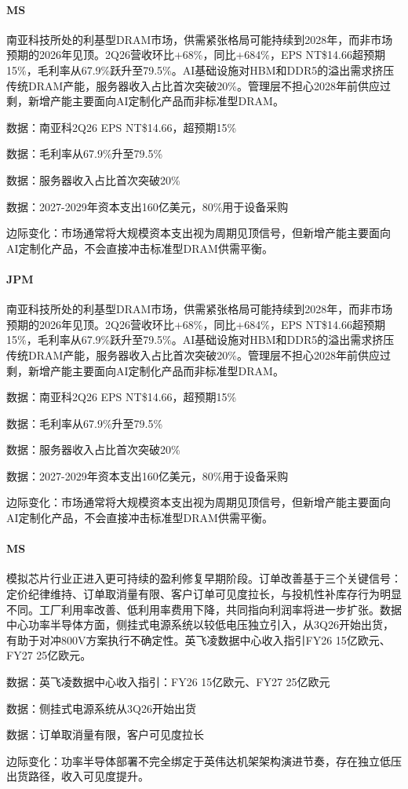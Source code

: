\documentclass[11pt]{ctexart}
\begin{document}
\paragraph{MS} 南亚科技所处的利基型DRAM市场，供需紧张格局可能持续到2028年，而非市场预期的2026年见顶。2Q26营收环比+68\%，同比+684\%，EPS NT\$14.66超预期15\%，毛利率从67.9\%跃升至79.5\%。AI基础设施对HBM和DDR5的溢出需求挤压传统DRAM产能，服务器收入占比首次突破20\%。管理层不担心2028年前供应过剩，新增产能主要面向AI定制化产品而非标准型DRAM。
{\small\color{refgray}数据：南亚科2Q26 EPS NT\$14.66，超预期15\%\par}
{\small\color{refgray}数据：毛利率从67.9\%升至79.5\%\par}
{\small\color{refgray}数据：服务器收入占比首次突破20\%\par}
{\small\color{refgray}数据：2027-2029年资本支出160亿美元，80\%用于设备采购\par}
{\small\color{refgray}边际变化：市场通常将大规模资本支出视为周期见顶信号，但新增产能主要面向AI定制化产品，不会直接冲击标准型DRAM供需平衡。\par}
\paragraph{JPM} 南亚科技所处的利基型DRAM市场，供需紧张格局可能持续到2028年，而非市场预期的2026年见顶。2Q26营收环比+68\%，同比+684\%，EPS NT\$14.66超预期15\%，毛利率从67.9\%跃升至79.5\%。AI基础设施对HBM和DDR5的溢出需求挤压传统DRAM产能，服务器收入占比首次突破20\%。管理层不担心2028年前供应过剩，新增产能主要面向AI定制化产品而非标准型DRAM。
{\small\color{refgray}数据：南亚科2Q26 EPS NT\$14.66，超预期15\%\par}
{\small\color{refgray}数据：毛利率从67.9\%升至79.5\%\par}
{\small\color{refgray}数据：服务器收入占比首次突破20\%\par}
{\small\color{refgray}数据：2027-2029年资本支出160亿美元，80\%用于设备采购\par}
{\small\color{refgray}边际变化：市场通常将大规模资本支出视为周期见顶信号，但新增产能主要面向AI定制化产品，不会直接冲击标准型DRAM供需平衡。\par}
\paragraph{MS} 模拟芯片行业正进入更可持续的盈利修复早期阶段。订单改善基于三个关键信号：定价纪律维持、订单取消量有限、客户订单可见度拉长，与投机性补库存行为明显不同。工厂利用率改善、低利用率费用下降，共同指向利润率将进一步扩张。数据中心功率半导体方面，侧挂式电源系统以较低电压独立引入，从3Q26开始出货，有助于对冲800V方案执行不确定性。英飞凌数据中心收入指引FY26 15亿欧元、FY27 25亿欧元。
{\small\color{refgray}数据：英飞凌数据中心收入指引：FY26 15亿欧元、FY27 25亿欧元\par}
{\small\color{refgray}数据：侧挂式电源系统从3Q26开始出货\par}
{\small\color{refgray}数据：订单取消量有限，客户可见度拉长\par}
{\small\color{refgray}边际变化：功率半导体部署不完全绑定于英伟达机架架构演进节奏，存在独立低压出货路径，收入可见度提升。\par}
\end{document}
